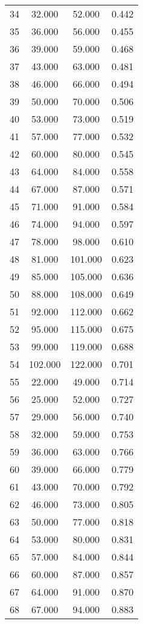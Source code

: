 \begin{tabular}{cccc}
  34 & 32.000 & 52.000 & 0.442 \\ 
  35 & 36.000 & 56.000 & 0.455 \\ 
  36 & 39.000 & 59.000 & 0.468 \\ 
  37 & 43.000 & 63.000 & 0.481 \\ 
  38 & 46.000 & 66.000 & 0.494 \\ 
  39 & 50.000 & 70.000 & 0.506 \\ 
  40 & 53.000 & 73.000 & 0.519 \\ 
  41 & 57.000 & 77.000 & 0.532 \\ 
  42 & 60.000 & 80.000 & 0.545 \\ 
  43 & 64.000 & 84.000 & 0.558 \\ 
  44 & 67.000 & 87.000 & 0.571 \\ 
  45 & 71.000 & 91.000 & 0.584 \\ 
  46 & 74.000 & 94.000 & 0.597 \\ 
  47 & 78.000 & 98.000 & 0.610 \\ 
  48 & 81.000 & 101.000 & 0.623 \\ 
  49 & 85.000 & 105.000 & 0.636 \\ 
  50 & 88.000 & 108.000 & 0.649 \\ 
  51 & 92.000 & 112.000 & 0.662 \\ 
  52 & 95.000 & 115.000 & 0.675 \\ 
  53 & 99.000 & 119.000 & 0.688 \\ 
  54 & 102.000 & 122.000 & 0.701 \\ 
  55 & 22.000 & 49.000 & 0.714 \\ 
  56 & 25.000 & 52.000 & 0.727 \\ 
  57 & 29.000 & 56.000 & 0.740 \\ 
  58 & 32.000 & 59.000 & 0.753 \\ 
  59 & 36.000 & 63.000 & 0.766 \\ 
  60 & 39.000 & 66.000 & 0.779 \\ 
  61 & 43.000 & 70.000 & 0.792 \\ 
  62 & 46.000 & 73.000 & 0.805 \\ 
  63 & 50.000 & 77.000 & 0.818 \\ 
  64 & 53.000 & 80.000 & 0.831 \\ 
  65 & 57.000 & 84.000 & 0.844 \\ 
  66 & 60.000 & 87.000 & 0.857 \\ 
  67 & 64.000 & 91.000 & 0.870 \\ 
  68 & 67.000 & 94.000 & 0.883 \\ 

\end{tabular}
